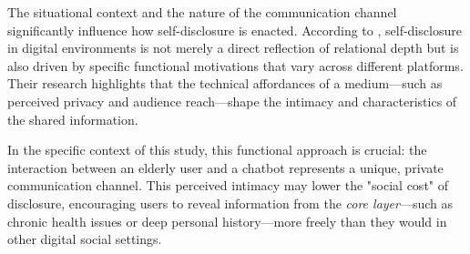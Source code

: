 The situational context and the nature of the communication channel significantly influence how self-disclosure is enacted. According to \cite{Bazarova2014}, self-disclosure in digital environments is not merely a direct reflection of relational depth but is also driven by specific functional motivations that vary across different platforms. Their research highlights that the technical affordances of a medium—such as perceived privacy and audience reach—shape the intimacy and characteristics of the shared information. 

In the specific context of this study, this functional approach is crucial: the interaction between an elderly user and a chatbot represents a unique, private communication channel. This perceived intimacy may lower the "social cost" of disclosure, encouraging users to reveal information from the \textit{core layer}—such as chronic health issues or deep personal history—more freely than they would in other digital social settings.


\newpage